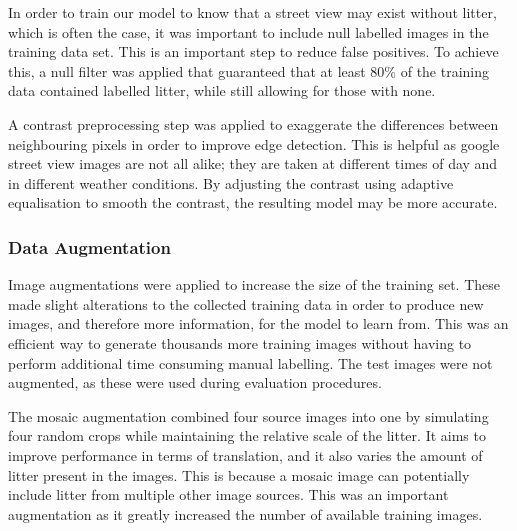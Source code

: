 \documentclass{thesis}
\begin{document}
In order to train our model to know that a street view may exist without litter, which is often the case, it was important to include null labelled images in the training data set. This is an important step to reduce false positives. To achieve this, a null filter was applied that guaranteed that at least 80\% of the training data contained labelled litter, while still allowing for those with none.

A contrast preprocessing step was applied to exaggerate the differences between neighbouring pixels in order to improve edge detection. This is helpful as google street view images are not all alike; they are taken at different times of day and in different weather conditions. By adjusting the contrast using adaptive equalisation to smooth the contrast, the resulting model may be more accurate.

\subsubsection{Data Augmentation}

Image augmentations were applied to increase the size of the training set. These made slight alterations to the collected training data in order to produce new images, and therefore more information, for the model to learn from. This was an efficient way to generate thousands more training images without having to perform additional time consuming manual labelling. The test images were not augmented, as these were used during evaluation procedures.

The mosaic augmentation combined four source images into one by simulating four random crops while maintaining the relative scale of the litter. It aims to improve performance in terms of translation, and it also varies the amount of litter present in the images. This is because a mosaic image can potentially include litter from multiple other image sources. This was an important augmentation as it greatly increased the number of available training images.
\end{document}
